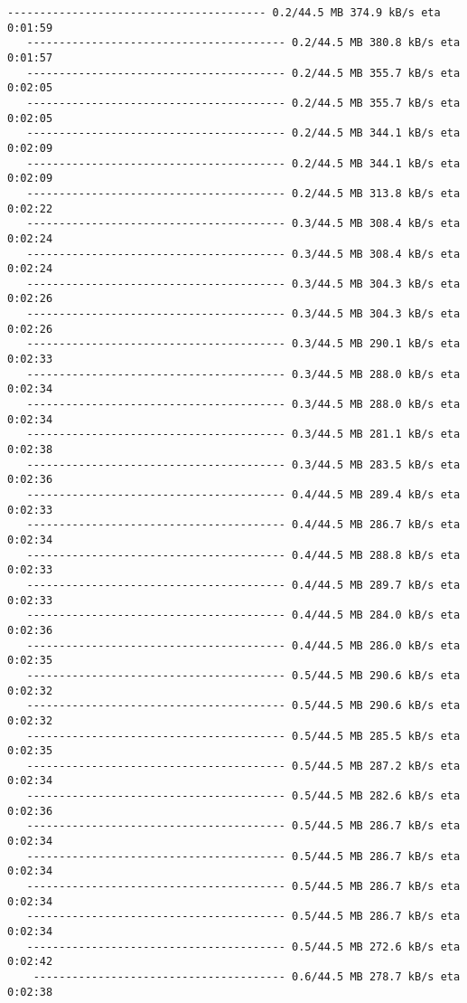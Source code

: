 \documentclass[11pt]{article}
\begin{document}
\begin{Verbatim}[commandchars=\\\{\}]
   ---------------------------------------- 0.2/44.5 MB 374.9 kB/s eta 0:01:59
   ---------------------------------------- 0.2/44.5 MB 380.8 kB/s eta 0:01:57
   ---------------------------------------- 0.2/44.5 MB 355.7 kB/s eta 0:02:05
   ---------------------------------------- 0.2/44.5 MB 355.7 kB/s eta 0:02:05
   ---------------------------------------- 0.2/44.5 MB 344.1 kB/s eta 0:02:09
   ---------------------------------------- 0.2/44.5 MB 344.1 kB/s eta 0:02:09
   ---------------------------------------- 0.2/44.5 MB 313.8 kB/s eta 0:02:22
   ---------------------------------------- 0.3/44.5 MB 308.4 kB/s eta 0:02:24
   ---------------------------------------- 0.3/44.5 MB 308.4 kB/s eta 0:02:24
   ---------------------------------------- 0.3/44.5 MB 304.3 kB/s eta 0:02:26
   ---------------------------------------- 0.3/44.5 MB 304.3 kB/s eta 0:02:26
   ---------------------------------------- 0.3/44.5 MB 290.1 kB/s eta 0:02:33
   ---------------------------------------- 0.3/44.5 MB 288.0 kB/s eta 0:02:34
   ---------------------------------------- 0.3/44.5 MB 288.0 kB/s eta 0:02:34
   ---------------------------------------- 0.3/44.5 MB 281.1 kB/s eta 0:02:38
   ---------------------------------------- 0.3/44.5 MB 283.5 kB/s eta 0:02:36
   ---------------------------------------- 0.4/44.5 MB 289.4 kB/s eta 0:02:33
   ---------------------------------------- 0.4/44.5 MB 286.7 kB/s eta 0:02:34
   ---------------------------------------- 0.4/44.5 MB 288.8 kB/s eta 0:02:33
   ---------------------------------------- 0.4/44.5 MB 289.7 kB/s eta 0:02:33
   ---------------------------------------- 0.4/44.5 MB 284.0 kB/s eta 0:02:36
   ---------------------------------------- 0.4/44.5 MB 286.0 kB/s eta 0:02:35
   ---------------------------------------- 0.5/44.5 MB 290.6 kB/s eta 0:02:32
   ---------------------------------------- 0.5/44.5 MB 290.6 kB/s eta 0:02:32
   ---------------------------------------- 0.5/44.5 MB 285.5 kB/s eta 0:02:35
   ---------------------------------------- 0.5/44.5 MB 287.2 kB/s eta 0:02:34
   ---------------------------------------- 0.5/44.5 MB 282.6 kB/s eta 0:02:36
   ---------------------------------------- 0.5/44.5 MB 286.7 kB/s eta 0:02:34
   ---------------------------------------- 0.5/44.5 MB 286.7 kB/s eta 0:02:34
   ---------------------------------------- 0.5/44.5 MB 286.7 kB/s eta 0:02:34
   ---------------------------------------- 0.5/44.5 MB 286.7 kB/s eta 0:02:34
   ---------------------------------------- 0.5/44.5 MB 272.6 kB/s eta 0:02:42
    --------------------------------------- 0.6/44.5 MB 278.7 kB/s eta 0:02:38

\end{Verbatim}
\end{document}
